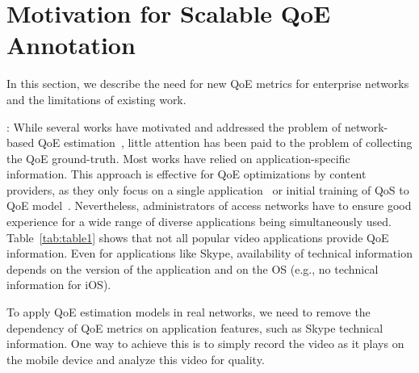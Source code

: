 \section{Motivation for Scalable QoE Annotation} \label{MOTIVATION}

In this section, we describe the need for new QoE metrics for enterprise networks and the limitations of existing work. 

:
While several works have motivated and addressed the problem of network-based QoE estimation~\cite{aggarwal2014prometheus}, little attention has been paid to the problem of collecting the QoE ground-truth. Most works have relied on application-specific information. This approach is effective for QoE optimizations by content providers, as they only focus on a single application~\cite{balachandran2013developing} or initial training of QoS to QoE model~\cite{aggarwal2014prometheus}. Nevertheless, administrators of access networks have to ensure good experience for a wide range of diverse applications being simultaneously used. 
Table~\ref{tab:table1} shows that not all popular video applications provide QoE information. 
Even for applications like Skype, availability of technical information depends on the version of the application and on the OS (e.g., no technical information for iOS). 

\begin{table}[htb!]
	\centering
		\scriptsize
			\vspace*{-0.5em}	
        \vspace*{0.2em}
		\hfill 
		\caption{Availability of QoE ground-truth}
		\label{tab:table1} 
\end{table}

To apply QoE estimation models in real networks, we need to remove the dependency of QoE metrics on application features, such as Skype technical information. One way to achieve this is to simply record the video as it plays on the mobile device and analyze this video for quality. 

